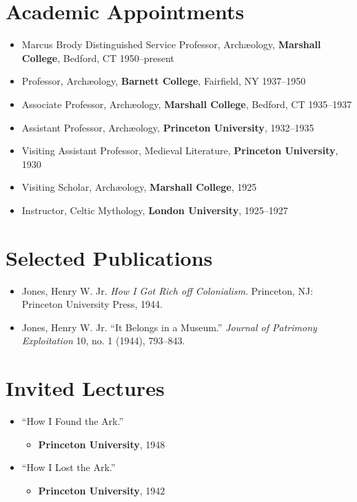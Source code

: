 \documentclass[%
    11pt,
  oneside
  ]{memoir}
\let\oldsection\section
\renewcommand{\section}[1]{%
  \oldsection{#1}
  \leavevmode
  \par
  \vspace{\dimexpr-\baselineskip-\parskip}
}
\begin{document}
\hypertarget{academic-appointments}{%
\section{Academic Appointments}\label{academic-appointments}}

\begin{itemize}
\tightlist
\item
  Marcus Brody Distinguished Service Professor, Archæology,
  \textbf{Marshall College}, Bedford, CT 1950--present
\item
  Professor, Archæology, \textbf{Barnett College}, Fairfield, NY
  1937--1950
\item
  Associate Professor, Archæology, \textbf{Marshall College}, Bedford,
  CT 1935--1937
\item
  Assistant Professor, Archæology, \textbf{Princeton University},
  1932--1935
\item
  Visiting Assistant Professor, Medieval Literature, \textbf{Princeton
  University}, 1930
\item
  Visiting Scholar, Archæology, \textbf{Marshall College}, 1925
\item
  Instructor, Celtic Mythology, \textbf{London University}, 1925--1927
\end{itemize}

\hypertarget{selected-publications}{%
\section{Selected Publications}\label{selected-publications}}

\begin{itemize}
\tightlist
\item
  Jones, Henry W. Jr. \emph{How I Got Rich off Colonialism}. Princeton,
  NJ: Princeton University Press, 1944.
\item
  Jones, Henry W. Jr. ``It Belongs in a Museum.'' \emph{Journal of
  Patrimony Exploitation} 10, no. 1 (1944), 793--843.
\end{itemize}

\hypertarget{invited-lectures}{%
\section{Invited Lectures}\label{invited-lectures}}

\begin{itemize}
\tightlist
\item
  ``How I Found the Ark.''

  \begin{itemize}
  \tightlist
  \item
    \textbf{Princeton University}, 1948
  \end{itemize}
\item
  ``How I Lost the Ark.''

  \begin{itemize}
  \tightlist
  \item
    \textbf{Princeton University}, 1942
  \end{itemize}
\end{itemize}
\end{document}
